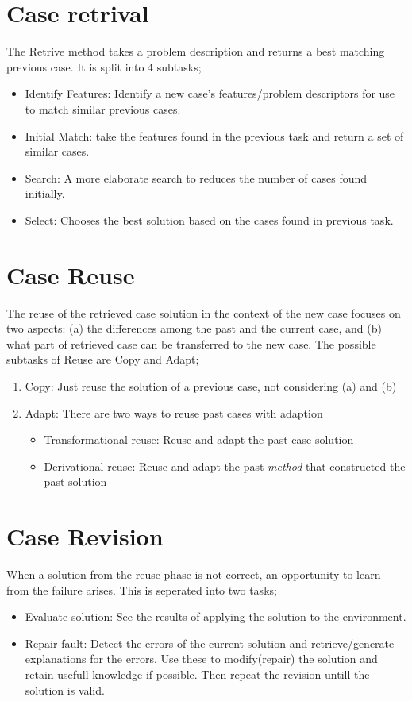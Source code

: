 \documentclass[11pt, letterpaper]{report}
\numberwithin{equation}{section}
\begin{document}
\section{Case retrival}
The Retrive method takes a problem description and returns a best matching
previous case. It is split into 4 subtasks;
\begin{itemize}
\item Identify Features: Identify a new case's features/problem descriptors for
  use to match similar previous cases.
\item Initial Match: take the features found in the previous task and return a set of
  similar cases.
\item Search: A more elaborate search to reduces the number of cases found initially.
\item Select: Chooses the best solution based on the cases found in previous task.
\end{itemize}

\section{Case Reuse}
The reuse of the retrieved case solution in the context of the new case focuses
on two aspects: (a) the differences  among  the  past  and  the  current  case,
and (b) what part of retrieved case can be transferred to the new  case.  The
possible  subtasks  of  Reuse  are  Copy and Adapt;
\begin{enumerate}
\item Copy: Just reuse the solution of a previous case, not considering (a) and (b)
\item Adapt: There are two ways to reuse past cases with adaption
  \begin{itemize}
  \item Transformational reuse: Reuse and adapt the past case solution
  \item Derivational reuse: Reuse and adapt the past \emph{ method } that
    constructed the past solution
  \end{itemize}
\end{enumerate}

\section{Case Revision}
When a solution from the reuse phase is not correct, an opportunity to learn from
the failure arises. This is seperated into two tasks;
\begin{itemize}
\item Evaluate solution: See the results of applying the solution to the environment.
\item Repair fault: Detect the errors of the current solution and
  retrieve/generate explanations for the errors. Use these to modify(repair) the
  solution and retain usefull knowledge if possible. Then repeat the revision
  untill the solution is valid.
\end{itemize}
\end{document}
